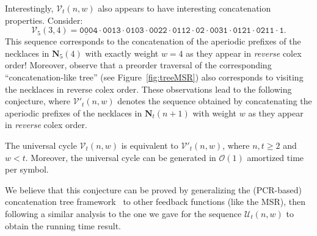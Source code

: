\documentclass[US-letter,USenglish,authorcolumns,autoref]{lipics-v2021}
\renewcommand{\tt} {\mathtt}
\newcommand{\bN}{\mathbf{N}}
\begin{document}
Interestingly, $\mathcal{V}_t(n,w)$ also appears to have interesting concatenation properties.  Consider:
%
\[ \mathcal{V}_5(3,4) = \tt{\underline{000}4 \cdot 0013 \cdot 0103 \cdot 0022 \cdot 0112 \cdot 02 \cdot 0031\cdot 0121 \cdot 0211 \cdot 1.} \]
This sequence corresponds to the concatenation of the aperiodic prefixes of the necklaces  in $\bN_5(4)$  with exactly weight $w=4$ as they appear in \emph{reverse} colex order!  Moreover, observe that a preorder traversal of the corresponding ``concatenation-like tree'' (see Figure~\ref{fig:treeMSR}) also corresponds to visiting the necklaces in reverse colex order.
%
These observations lead to the following conjecture, where $\mathcal{V'}_t(n,w)$ denotes the sequence obtained by 
concatenating the aperiodic prefixes of the necklaces in $\bN_t(n+1)$  with weight $w$ as they appear in \emph{reverse} colex order.
%
\begin{conjecture}
The universal cycle $\mathcal{V}_t(n,w)$ is equivalent to $\mathcal{V'}_t(n,w)$, where $n,t \geq 2$ and $w < t$.   Moreover, 
the universal cycle can be generated in $\mathcal{O}(1)$ amortized time per symbol.
\end{conjecture}
%

\noindent
We believe that this conjecture can be proved by generalizing the (PCR-based) concatenation tree framework~\cite{concattree} to other feedback functions (like the MSR), then following a similar analysis to the one we gave for the sequence $\mathcal{U}_t(n,w)$ to obtain the running time result.



\end{document}
